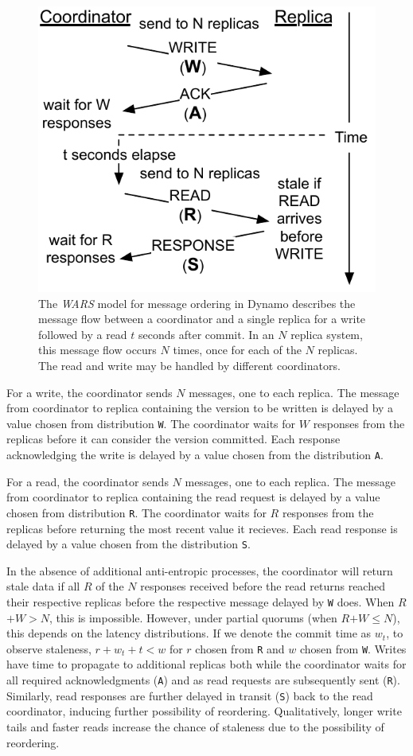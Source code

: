 \documentclass{vldb}
\begin{document}
\begin{figure}
\centering
\includegraphics[width=.8\columnwidth]{figs/dynamostale.pdf}
\caption{The \textit{WARS} model for message ordering in Dynamo
  describes the message flow between a coordinator and a single
  replica for a write followed by a read $t$ seconds after commit.  In
  an $N$ replica system, this message flow occurs $N$ times, once for
  each of the $N$ replicas.  The read and write may be handled by
  different coordinators.}
\label{fig:dynamo-diagram}
\end{figure}

For a write, the coordinator sends $N$ messages, one to each
replica. The message from coordinator to replica containing the
version to be written is delayed by a value chosen from distribution
\texttt{W}.  The coordinator waits for $W$ responses from the replicas
before it can consider the version committed.  Each response
acknowledging the write is delayed by a value chosen from the
distribution \texttt{A}.

For a read, the coordinator sends $N$ messages, one to each replica.
The message from coordinator to replica containing the read request is
delayed by a value chosen from distribution \texttt{R}.  The
coordinator waits for $R$ responses from the replicas before returning
the most recent value it recieves.  Each read response is delayed by a
value chosen from the distribution \texttt{S}.

In the absence of additional anti-entropic processes, the coordinator
will return stale data if all $R$ of the $N$ responses received before
the read returns reached their respective replicas before the
respective message delayed by \texttt{W} does.  When $R$$+$$W$$>$$N$,
this is impossible.  However, under partial quorums (when
$R$$+$$W$$\leq$$N$), this depends on the latency distributions.  If we
denote the commit time as $w_t$, to observe staleness, $r+w_t+t< w$ for
$r$ chosen from \texttt{R} and $w$ chosen from \texttt{W}.  Writes
have time to propagate to additional replicas both while the
coordinator waits for all required acknowledgments (\texttt{A}) and as
read requests are subsequently sent (\texttt{R}).  Similarly, read
responses are further delayed in transit (\texttt{S}) back to the read
coordinator, inducing further possibility of reordering.
Qualitatively, longer write tails and faster reads increase the chance
of staleness due to the possibility of reordering.
\end{document}
